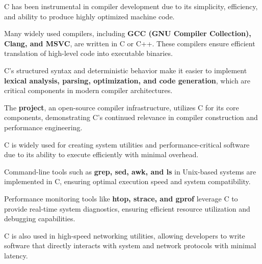 \begin{NxSSSSBox}
	\begin{NxIDBox}
		C has been instrumental in compiler development due to its simplicity, efficiency, and ability to produce highly optimized machine code.
	\end{NxIDBox}
	\begin{NxIDBox}
		Many widely used compilers, including \textbf{GCC (GNU Compiler Collection), Clang, and MSVC}, are written in C or C++. These compilers ensure efficient translation of high-level code into executable binaries.
	\end{NxIDBox}
	\begin{NxIDBox}
		C’s structured syntax and deterministic behavior make it easier to implement \textbf{lexical analysis, parsing, optimization, and code generation}, which are critical components in modern compiler architectures.
	\end{NxIDBox}
	\begin{NxIDBox}
		The \textbf{ project}, an open-source compiler infrastructure, utilizes C for its core components, demonstrating C’s continued relevance in compiler construction and performance engineering.
	\end{NxIDBox}
\end{NxSSSSBox}

\begin{NxSSSSBox}
	\begin{NxIDBox}
		C is widely used for creating system utilities and performance-critical software due to its ability to execute efficiently with minimal overhead.
	\end{NxIDBox}
	\begin{NxIDBox}
		Command-line tools such as \textbf{grep, sed, awk, and ls} in Unix-based systems are implemented in C, ensuring optimal execution speed and system compatibility.
	\end{NxIDBox}
	\begin{NxIDBox}
		Performance monitoring tools like \textbf{htop, strace, and gprof} leverage C to provide real-time system diagnostics, ensuring efficient resource utilization and debugging capabilities.
	\end{NxIDBox}
	\begin{NxIDBox}
		C is also used in high-speed networking utilities, allowing developers to write software that directly interacts with system  and network protocols with minimal latency.
	\end{NxIDBox}
\end{NxSSSSBox}

